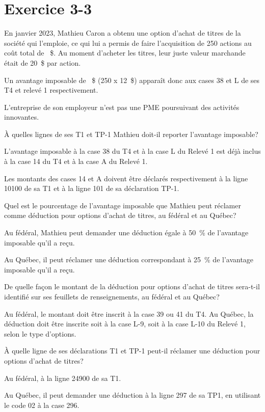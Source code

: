 \section{Exercice 3-3}
\setcounter{question}{0}
\begin{question}
	En janvier 2023, Mathieu Caron a obtenu une option d'achat de titres de la société qui l'emploie, ce qui lui a permis de faire l'acquisition de 250 actions au coût total de ~\$. Au moment d'acheter les titres, leur juste valeur marchande était de 20~\$ par action. 
	
	Un avantage imposable de ~\$ (250 x 12~\$) apparaît donc aux cases 38 et L de ses T4 et relevé 1 respectivement. 
	
	L'entreprise de son employeur n'est pas une PME poursuivant des activités innovantes. 
\end{question}
\setcounter{sousQuestion}{0}
\begin{sousQuestion}
	À quelles lignes de ses T1 et TP-1 Mathieu doit-il reporter l'avantage imposable?
\end{sousQuestion}
L'avantage imposable à la case 38 du T4 et à la case L du Relevé 1 est déjà inclus à la case 14 du T4 et à la case A du Relevé 1.

Les montants des cases 14 et A doivent être déclarés respectivement à la ligne 10100 de sa T1 et à la ligne 101 de sa déclaration TP-1.

\begin{sousQuestion}
	Quel est le pourcentage de l'avantage imposable que Mathieu peut réclamer comme déduction pour options d'achat de titres, au fédéral et au Québec?
\end{sousQuestion}
Au fédéral, Mathieu peut demander une déduction égale à 50~\% de l'avantage imposable qu'il a reçu.

Au Québec, il peut réclamer une déduction correspondant à 25~\% de l'avantage imposable qu'il a reçu.

\begin{sousQuestion}
	De quelle façon le montant de la déduction pour options d'achat de titres sera-t-il identifié sur ses feuillets de renseignements, au fédéral et au Québec?
\end{sousQuestion}
Au fédéral, le montant doit être inscrit à la case 39 ou 41 du T4. Au Québec, la déduction doit être inscrite soit à la case L-9, soit à la case L-10 du Relevé 1, selon le type d'options. 

\begin{sousQuestion}
	À quelle ligne de ses déclarations T1 et TP-1 peut-il réclamer une déduction pour options d'achat de titres?
\end{sousQuestion}
Au fédéral, à la ligne 24900 de sa T1.

Au Québec, il peut demander une déduction à la ligne 297 de sa TP1, en utilisant le code 02 à la case 296.
